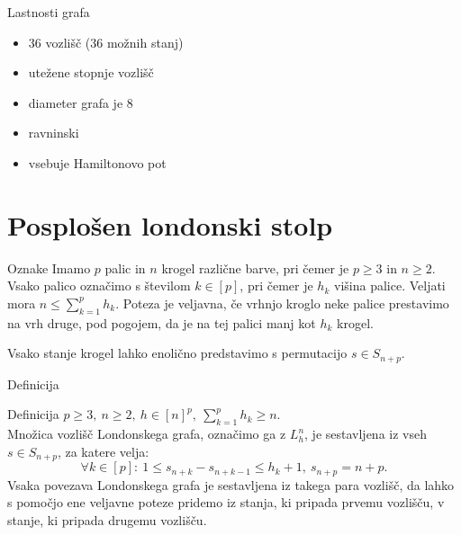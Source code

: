 \documentclass{beamer}
\begin{document}
\begin{frame}{Lastnosti grafa}
    \begin{itemize}
        \item 36 vozlišč (36 možnih stanj)
        \item utežene stopnje vozlišč
        \item diameter grafa je 8
        \item ravninski
        \item vsebuje Hamiltonovo pot
    \end{itemize}
\end{frame}

\section{Posplošen londonski stolp}
\begin{frame}{Oznake}
    Imamo $p$ palic in $n$ krogel različne barve, pri čemer je $p \geq 3 \text{ in } n \geq 2$. Vsako palico označimo s številom $k \in [p]$, pri čemer je $h_k$ višina palice. Veljati mora $n \leq \sum_{k=1}^p h_k$. Poteza je veljavna, če vrhnjo kroglo neke palice prestavimo na vrh druge, pod pogojem, da je na tej palici manj kot $h_k$ krogel.
    
    Vsako stanje krogel lahko enolično predstavimo s permutacijo $s \in S_{n+p}$.
\end{frame}

\begin{frame}{Definicija}
    \begin{block}{Definicija}
        $p \geq 3,\ n \geq 2,\ h \in [n]^p,\  \sum_{k=1}^p h_k \geq n$. \\
        Množica vozlišč \alert{Londonskega grafa}, označimo ga z $L_h^n$, je sestavljena iz vseh $s \in S_{n+p}$, za katere velja:
        \[\forall k \in [p]:\ 1 \leq s_{n+k} - s_{n+k-1} \leq h_k + 1,\ s_{n+p} = n + p .\]
        Vsaka povezava Londonskega grafa je sestavljena iz takega para vozlišč, da lahko s pomočjo ene veljavne poteze pridemo iz stanja, ki pripada prvemu vozlišču, v stanje, ki pripada drugemu vozlišču.
    \end{block}

\end{frame}
\end{document}
